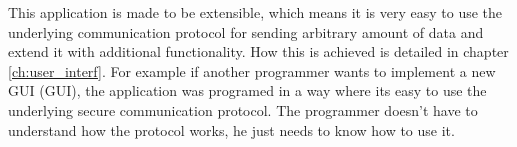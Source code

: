 This application is made to be extensible, which means it is very easy to use the underlying communication protocol for sending arbitrary amount of data and extend it with additional functionality. How this is achieved is detailed in chapter \ref{ch:user_interf}. For example if another programmer wants to implement a new GUI (\acl{GUI}), the application was programed in a way where its easy to use the underlying secure communication protocol. The programmer doesn't have to understand how the protocol works, he just needs to know how to use it.
